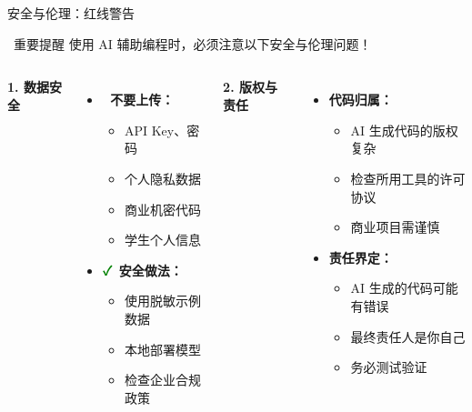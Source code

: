 
\begin{frame}{安全与伦理：红线警告}
	\begin{alertblock}{\faExclamationTriangle\ 重要提醒}
		使用 AI 辅助编程时，必须注意以下安全与伦理问题！
	\end{alertblock}

	\vspace{0.3cm}

	\begin{columns}
		\textbf{1. 数据安全}

		\begin{itemize}
			\item \textbf{\textcolor{red}{\faTimes}\ 不要上传：}
			      \begin{itemize}
				      \item API Key、密码
				      \item 个人隐私数据
				      \item 商业机密代码
				      \item 学生个人信息
			      \end{itemize}

			\item \textbf{\textcolor{green}{\faCheck}\ 安全做法：}
			      \begin{itemize}
				      \item 使用脱敏示例数据
				      \item 本地部署模型
				      \item 检查企业合规政策
			      \end{itemize}
		\end{itemize}

		\textbf{2. 版权与责任}

		\begin{itemize}
			\item \textbf{代码归属：}
			      \begin{itemize}
				      \item AI 生成代码的版权复杂
				      \item 检查所用工具的许可协议
				      \item 商业项目需谨慎
			      \end{itemize}

			\item \textbf{责任界定：}
			      \begin{itemize}
				      \item AI 生成的代码可能有错误
				      \item 最终责任人是你自己
				      \item 务必测试验证
			      \end{itemize}
		\end{itemize}


\end{columns}
\end{frame}
